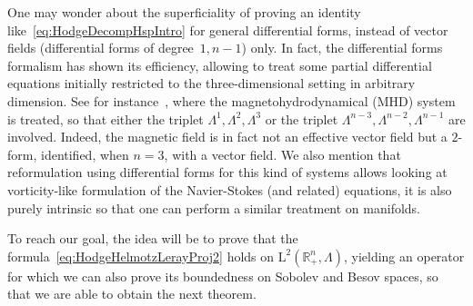 \documentclass[10pt]{amsart}
\theoremstyle{definition}\newtheorem{defi}[theo]{Definition}\newtheorem{rema}[theo]{Remark}\newtheorem{exam}[theo]{Example}\newtheorem{exem}[theo]{Example}\newtheorem{nota}[theo]{Notation}
\newcommand{\bbR}{\mathbb{R}}
\newcommand{\rmL}{\mathrm{L}}
\begin{document}
One may wonder about the superficiality of proving an identity like~\eqref{eq:HodgeDecompHspIntro} for general differential forms, instead of vector fields (differential forms of degree~$1,n-1$) only. In fact, the differential forms formalism has shown its efficiency, allowing to treat some partial differential equations initially restricted to the three-dimensional setting in arbitrary dimension. See for instance~\cite{Monniaux2021,Denis2022}, where the magnetohydrodynamical (MHD) system is treated, so that either the triplet $\Lambda^{1},\Lambda^{2},\Lambda^{3}$ or the triplet $\Lambda^{n-3},\Lambda^{n-2},\Lambda^{n-1}$ are involved. Indeed, the magnetic field is in fact not an effective vector field but a $2$-form, identified, when $n=3$, with a vector field. We also mention that reformulation using differential forms for this kind of systems allows looking at vorticity-like formulation of the Navier-Stokes (and related) equations, it is also purely intrinsic so that one can perform a similar treatment on manifolds.

To reach our goal, the idea will be to prove that the formula~\eqref{eq:HodgeHelmotzLerayProj2} holds on $\rmL^2(\bbR^n_+,\Lambda)$, yielding an operator for which we can also prove its boundedness on Sobolev and Besov spaces, so that we are able to obtain the next theorem.
\end{document}
